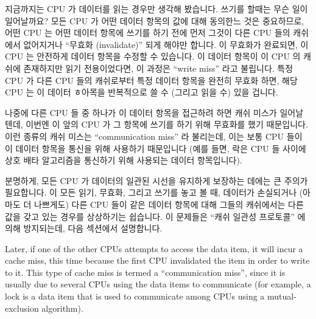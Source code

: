 \fi

지금까지는 CPU 가 데이터를 읽는 경우만 생각해 봤습니다.
쓰기를 할때는 무슨 일이 일어날까요?
모든 CPU 가 어떤 데이터 항목의 값에 대해 동의한느 것은 중요하므로, 어떤 CPU 는
어떤 데이터 항목에 쓰기를 하기 전에 먼저 그것이 다른 CPU 들의 캐쉬에서
없어지거나 ``무효화 (invalidate)'' 되게 해야만 합니다.
이 무효화가 완료되면, 이 CPU 는 안전하게 데이터 항목을 수정할 수 있습니다.
이 데이터 항목이 이 CPU 의 캐쉬에 존재하지만 읽기 전용이었다면, 이 과정은
``write miss'' 라고 불립니다.
특정 CPU 가 다른 CPU 들의 캐쉬로부터 특정 데이터 항목을 완전히 무효화 하면,
해당 CPU 는 이 데이터 ㅎ아목을 반복적으로 쓸 수 (그리고 읽을 수) 있을 겁니다.

\iffalse

Thus far, we have been considering only cases where a CPU reads
a data item.
What happens when it does a write?
Because it is important that all CPUs agree on the value of a given
data item, before a given CPU writes to that data item, it must first
cause it to be removed, or ``invalidated'', from other CPUs' caches.
Once this invalidation has completed, the CPU may safely modify the
data item.
If the data item was present in this CPU's cache, but was read-only,
this process is termed a ``write miss''.
Once a given CPU has completed invalidating a given data item from other
CPUs' caches, that CPU may repeatedly write (and read) that data item.

\fi

나중에 다른 CPU 들 중 하나가 이 데이터 항목을 접근하려 하면 캐쉬 미스가 일어날
텐데, 이번엔 이 앞의 CPU 가 그 항목에 쓰기를 하기 위해 무효화를 했기
때문입니다.
이런 종류의 캐쉬 미스는 ``communication miss'' 라 불리는데, 이는 보통 CPU 들이
이 데이터 항목을 통신을 위해 사용하기 때문입니다 (예를 들면, 락은 CPU 들 사이에
상호 배타 알고리즘을 통신하기 위해 사용되는 데이터 항목입니다).

분명하게, 모든 CPU 가 데이터의 일관된 시선을 유지하게 보장하는 데에는 큰 주의가
필요합니다.
이 모든 읽기, 무효화, 그리고 쓰기를 놓고 볼 때, 데이터가 손실되거나 (아마도 더
나쁘게도) 다른 CPU 들이 같은 데이터 항목에 대해 그들의 캐쉬에서는 다른 값을
갖고 있는 경우를 상상하기는 쉽습니다.
이 문제들은 ``캐쉬 일관성 프로토콜'' 에 의해 방지되는데, 다음 섹션에서
설명합니다.

\iffalse

Later, if one of the other CPUs attempts to access the data item, it
will incur a cache miss, this time because the first CPU invalidated
the item in order to write to it.
This type of cache miss is termed a ``communication miss'', since it
is usually due to several CPUs using the data items to communicate
(for example, a lock is a data item that is used to communicate among
CPUs using a mutual-exclusion algorithm).

